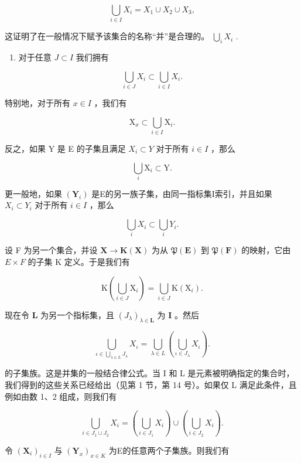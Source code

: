 \[
\bigcup_ {i \in I} X _ {i} = X _ {1} \cup X _ {2} \cup X _ {3},
\]

这证明了在一般情况下赋予该集合的名称“并”是合理的。 \(\bigcup_{i}X_{i}\) .

\begin{enumerate}
\def\labelenumi{\arabic{enumi}.}
\setcounter{enumi}{2}
\tightlist
\item
  对于任意 \(J \subset I\) 我们拥有
\end{enumerate}

\[
\bigcup_ {i \in J} X _ {i} \subset \bigcup_ {i \in I} X _ {i}.
\]

特别地，对于所有 \(x \in I\) ，我们有

\[
\mathrm{X} _ {x} \subset \bigcup_ {i \in I} \mathrm{X} _ {i}.
\]

反之，如果 Y 是 E 的子集且满足 \(X_{i} \subset Y\) 对于所有 \(i \in I\) ，那么

\[
\bigcup_ {i} \mathrm{X} _ {i} \subset \mathrm{Y}.
\]

更一般地，如果 \((\mathbf{Y}_{i})\) 是E的另一族子集，由同一指标集I索引，并且如果 \(X_{i} \subset Y_{i}\) 对于所有 \(i \in I\) ，那么

\[
\bigcup_ {i} X _ {i} \subset \bigcup_ {i} Y _ {i}.
\]

设 F 为另一个集合，并设 \(\mathbf{X} \to \mathbf{K}(\mathbf{X})\) 为从 \(\mathfrak{P}(\mathbf{E})\) 到 \(\mathfrak{P}(\mathbf{F})\) 的映射，它由 \(E \times F\) 的子集 K 定义。于是我们有

\[
\mathrm{K} \left(\bigcup_ {i \in J} \mathrm{X} _ {i}\right) = \bigcup_ {i \in J} \mathrm{K} (\mathrm{X} _ {i}).\tag{34}
\]

现在令 \(\mathbf{L}\) 为另一个指标集，且 \((J_{\lambda})_{\lambda \in \mathbf{L}}\) 为 \(\mathbf{I}\) 。然后

\[
\bigcup_ {\iota \in \bigcup_ {\lambda \in L} J _ {\lambda}} X _ {\iota} = \bigcup_ {\lambda \in L} \left(\bigcup_ {\iota \in J _ {\lambda}} X _ {\iota}\right).\tag{35}
\]

的子集族。这是并集的一般结合律公式。当 I 和 L 是元素被明确指定的集合时，我们得到的这些关系已经给出（见第 1 节，第 14 号）。如果仅 L 满足此条件，且例如由数 1、2 组成，则我们有

\[
\bigcup_ {i \in J _ {1} \cup J _ {2}} X _ {i} = \left(\bigcup_ {i \in J _ {1}} X _ {i}\right) \cup \left(\bigcup_ {i \in J _ {2}} X _ {i}\right).\tag{36}
\]

令 \((\mathbf{X}_i)_{i\in I}\) 与 \((\mathbf{Y}_x)_{x\in K}\) 为E的任意两个子集族。则我们有

